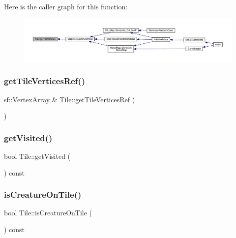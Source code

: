 Here is the caller graph for this function\+:
\nopagebreak
\begin{figure}[H]
\begin{center}
\leavevmode
\includegraphics[width=350pt]{df/d79/class_tile_ab3414f28d4e7334903bc9e8f8451ccee_icgraph}
\end{center}
\end{figure}
\mbox{\label{class_tile_a809331f7f2702ca0e0473446b7e37b06}} 
\subsubsection{\texorpdfstring{get\+Tile\+Vertices\+Ref()}{getTileVerticesRef()}}
{\footnotesize\ttfamily sf\+::\+Vertex\+Array \& Tile\+::get\+Tile\+Vertices\+Ref (\begin{DoxyParamCaption}{ }\end{DoxyParamCaption})}

\mbox{\label{class_tile_aa062f5d016739f13f9239341acb75e73}} 
\subsubsection{\texorpdfstring{get\+Visited()}{getVisited()}}
{\footnotesize\ttfamily bool Tile\+::get\+Visited (\begin{DoxyParamCaption}{ }\end{DoxyParamCaption}) const}

\mbox{\label{class_tile_a450d291bd9711aa77373d56c37cea05a}} 
\subsubsection{\texorpdfstring{is\+Creature\+On\+Tile()}{isCreatureOnTile()}}
{\footnotesize\ttfamily bool Tile\+::is\+Creature\+On\+Tile (\begin{DoxyParamCaption}{ }\end{DoxyParamCaption}) const}

